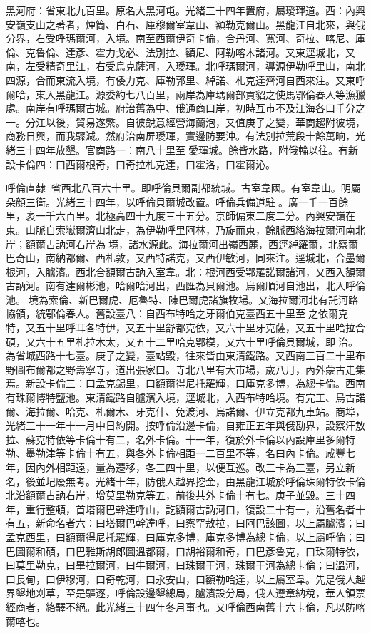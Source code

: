 \begin{pinyinscope}
黑河府：省東北九百里。原名大黑河屯。光緒三十四年置府，屬璦琿道。西：內興安嶺支山之著者，煙筒、白石、庫穆爾室韋山、額勒克爾山。黑龍江自北來，與俄分界，右受呼瑪爾河，入境。南至西爾伊奇卡倫，合丹河、寬河、奇拉、喀尼、庫倫、克魯倫、達彥、霍力戈必、法別拉、額尼、阿勒喀木諸河。又東逕城北，又南，左受精奇里江，右受烏克薩河，入璦琿。北呼瑪爾河，導源伊勒呼里山，南北四源，合而東流入境，有倭力克、庫勒郭里、綽諾、札克達齊河自西來注。又東呼爾哈，東入黑龍江。源委約七八百里，兩岸為庫瑪爾部貢貂之使馬鄂倫春人等漁獵處。南岸有呼瑪爾古城。府治舊為中、俄通商口岸，初時互市不及江海各口千分之一。分江以後，貿易遂繁。自彼銳意經營海蘭泡，又值庚子之變，華商趨附彼境，商務日興，而我驟減。然府治南屏璦琿，實邊防要沖。有法別拉荒段十餘萬晌，光緒三十四年放墾。官商路一：南八十里至愛琿城。餘皆水路，附俄輪以往。有新設卡倫四：曰西爾根奇，曰奇拉札克達，曰霍洛，曰霍爾沁。

呼倫直隸：省西北八百六十里。即呼倫貝爾副都統城。古室韋國。有室韋山。明屬朵顏三衛。光緒三十四年，以呼倫貝爾城改置。呼倫兵備道駐。廣一千一百餘里，袤一千六百里。北極高四十九度三十五分。京師偏東二度二分。內興安嶺在東。山脈自索嶽爾濟山北走，為伊勒呼里阿林，乃旋而東，餘脈西絡海拉爾河南北岸；額爾古訥河右岸為境，諸水源此。海拉爾河出嶺西麓，西逕綽羅爾，北察爾巴奇山，南納都爾、西札敦，又西特諾克，又西伊敏河，同來注。逕城北，合墨爾根河，入臚濱。西北合額爾古訥入室韋。北：根河西受鄂羅諾爾諸河，又西入額爾古訥河。南有達爾彬池，哈爾哈河出，西匯為貝爾池。烏爾順河自池出，北入呼倫池。境為索倫、新巴爾虎、厄魯特、陳巴爾虎諸旗牧場。又海拉爾河北有託河路協領，統鄂倫春人。舊設臺八：自西布特哈之牙爾伯克臺西五十里至之依爾克特，又五十里呼耳各特伊，又五十里舒都克依，又六十里牙克薩，又五十里哈拉合碩，又六十五里札拉木太，又五十二里哈克鄂模，又六十里呼倫貝爾城，即治。為省城西路十七臺。庚子之變，臺站毀，往來皆由東清鐵路。又西南三百二十里布野圖布爾都之野壽寧寺，道出張家口。寺北八里有大市場，歲八月，內外蒙古走集焉。新設卡倫三：曰孟克錫里，曰額爾得尼托羅輝，曰庫克多博，為總卡倫。西南有珠爾博特鹽池。東清鐵路自臚濱入境，逕城北，入西布特哈境。有完工、烏古諾爾、海拉爾、哈克、札爾木、牙克什、免渡河、烏諾爾、伊立克都九車站。商埠，光緒三十一年十一月中日約開。按呼倫沿邊卡倫，自雍正五年與俄勘界，設察汗敖拉、蘇克特依等卡倫十有二，名外卡倫。十一年，復於外卡倫以內設庫里多爾特勒、墨勒津等卡倫十有五，與各外卡倫相距一二百里不等，名曰內卡倫。咸豐七年，因內外相距遠，量為遷移，各三四十里，以便互巡。改三卡為三臺，另立新名，後並圮廢無考。光緒十年，防俄人越界挖金，由黑龍江城於呼倫珠爾特依卡倫北沿額爾古訥右岸，增莫里勒克等五，前後共外卡倫十有七。庚子並毀。三十四年，重行整頓，首塔爾巴幹達呼山，訖額爾古訥河口，復設二十有一，沿舊名者十有五，新命名者六：曰塔爾巴幹達呼，曰察罕敖拉，曰阿巴該圖，以上屬臚濱；曰孟克西里，曰額爾得尼托羅輝，曰庫克多博，庫克多博為總卡倫，以上屬呼倫；曰巴圖爾和碩，曰巴雅斯胡郎圖溫都爾，曰胡裕爾和奇，曰巴彥魯克，曰珠爾特依，曰莫里勒克，曰畢拉爾河，曰牛爾河，曰珠爾干河，珠爾干河為總卡倫；曰溫河，曰長甸，曰伊穆河，曰奇乾河，曰永安山，曰額勒哈達，以上屬室韋。先是俄人越界墾地刈草，至是驅逐，呼倫設邊墾總局，臚濱設分局，俄人遵章納稅，華人領票經商者，絡驛不絕。此光緒三十四年冬月事也。又呼倫西南舊十六卡倫，凡以防喀爾喀也。


\end{pinyinscope}
